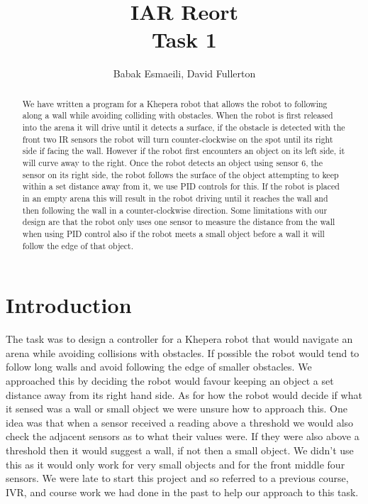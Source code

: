 \documentclass[]{article}
\begin{document}
\title{IAR Reort\\Task 1}
\author{Babak Esmaeili, David Fullerton}
\maketitle

\begin{abstract}
We have written a program for a Khepera robot that allows the robot to following along a wall while avoiding colliding with obstacles. When the robot is first released into the arena it will drive until it detects a surface, if the obstacle is detected with the front two IR sensors the robot will turn counter-clockwise on the spot until its right side if facing the wall. However if the robot first encounters an object on its left side, it will curve away to the right. Once the robot detects an object using sensor 6, the sensor on its right side, the robot follows the surface of the object attempting to keep within a set distance away from it, we use PID controls for this. If the robot is placed in an empty arena this will result in the robot driving until it reaches the wall and then following the wall in a counter-clockwise direction. Some limitations with our design are that the robot only uses one sensor to measure the distance from the wall when using PID control also if the robot meets a small object before a wall it will follow the edge of that object.
\end{abstract}


\section{Introduction}
The task was to design a controller for a Khepera robot that would navigate an arena while avoiding collisions with obstacles. If possible the robot would tend to follow long walls and avoid following the edge of smaller obstacles. We approached this by deciding the robot would favour keeping an object a set distance away from its right hand side. As for how the robot would decide if what it sensed was a wall or small object we were unsure how to approach this. One idea was that when a sensor received a reading above a threshold we would also check the adjacent sensors as to what their values were. If they were also above a threshold then it would suggest a wall, if not then a small object. We didn’t use this as it would only work for very small objects and for the front middle four sensors. We were late to start this project and so referred to a previous course, IVR, and course work we had done in the past to help our approach to this task.
\end{document}
